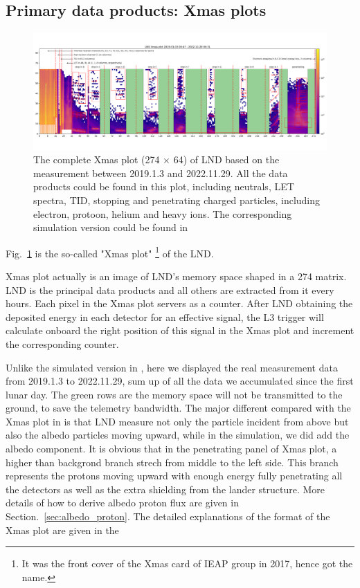 \subsection{Primary data products: Xmas plots}
\begin{figure}
    \centerfloat
    \includegraphics[width =\textheight, height = 0.6\textheight, angle = 90]{images/xmas-2019-01-03To2022-11-29.png}
    \caption[LND Xmas plot based on the measurement between 2019.1.3 and 2022.11.29]{The complete Xmas plot (274 $\times$ 64) of LND based on the measurement between 2019.1.3 and 2022.11.29. All the data products could be found in this plot, including neutrals, \ac{LET} spectra, \ac{TID}, stopping and penetrating charged particles, including electron, protoon, helium and heavy ions. The corresponding simulation version could be found in \citep{Wimmer2020SSRv}}
    \label{Fig: measurement_Xmas}
\end{figure}
\clearpage
Fig.~\ref{Fig: measurement_Xmas} is the so-called "Xmas plot" \footnote{It was the front cover of the Xmas card of IEAP group in 2017, hence got the name.} of the LND. 

Xmas plot actually is an image of \ac{LND}'s memory space shaped in a 274  matrix. LND is the principal data products and all others are extracted from it every hours. Each pixel in the Xmas plot servers as a counter. After LND obtaining the deposited energy in each detector for an effective signal, the L3 trigger will calculate onboard the right position of this signal in the Xmas plot and increment the corresponding counter. 

Unlike the simulated version in \citep{Wimmer2020SSRv}, here we displayed the real measurement data from 2019.1.3 to 2022.11.29, sum up of all the data we accumulated since the first lunar day. The green rows are the memory space will not be transmitted to the ground, to save the telemetry bandwidth. The major different compared with the Xmas plot in \citep{Wimmer2020SSRv} is that LND measure not only the particle incident from above but also the albedo particles moving upward, while in the simulation, we did add the albedo component. It is obvious that in the penetrating panel of Xmas plot,  a higher than backgrond branch strech from middle to the left side. This branch represents the protons moving upward with enough energy fully penetrating all the detectors as well as the extra shielding from the lander structure. More details of how to derive albedo proton flux are given in Section.~\ref{sec:albedo_proton}.
The detailed explanations of the format of the Xmas plot are given in the \citep{Wimmer2020SSRv}


